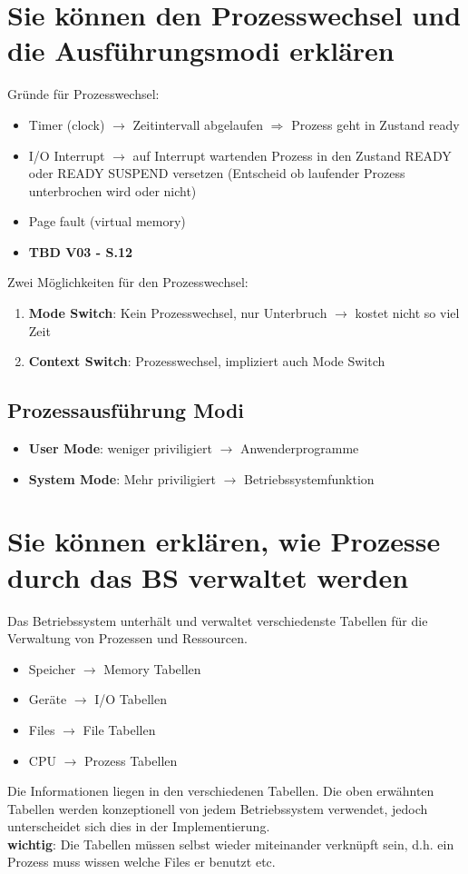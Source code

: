 \documentclass{report}
\theoremstyle{definition}
\theoremstyle{example}
\begin{document}
\section{Sie können den Prozesswechsel und die Ausführungsmodi erklären}
Gründe für Prozesswechsel:\\
\begin{itemize}
	\item Timer (clock) $\rightarrow$ Zeitintervall abgelaufen $\Rightarrow$ Prozess geht in Zustand ready
	\item I/O Interrupt $\rightarrow$ auf Interrupt wartenden Prozess in den Zustand READY oder READY SUSPEND versetzen (Entscheid ob laufender Prozess unterbrochen wird oder nicht)
	\item Page fault (virtual memory)
	\item \textbf{TBD V03 - S.12}
\end{itemize}

Zwei Möglichkeiten für den Prozesswechsel:\\
\begin{enumerate}
	\item \textbf{Mode Switch}: Kein Prozesswechsel, nur Unterbruch $\rightarrow$ kostet nicht so viel Zeit
	\item \textbf{Context Switch}: Prozesswechsel, impliziert auch Mode Switch
\end{enumerate}

	\subsection{Prozessausführung Modi}
\begin{itemize}
	\item \textbf{User Mode}: weniger priviligiert $\rightarrow$ Anwenderprogramme\\
	\item \textbf{System Mode}: Mehr priviligiert $\rightarrow$ Betriebssystemfunktion
\end{itemize}

\section{Sie können erklären, wie Prozesse durch das BS verwaltet werden}
Das Betriebssystem unterhält und verwaltet verschiedenste Tabellen für die Verwaltung von Prozessen und Ressourcen.
\begin{itemize}
	\item Speicher $\rightarrow$ Memory Tabellen
	\item Geräte $\rightarrow$ I/O Tabellen
	\item Files $\rightarrow$ File Tabellen
	\item CPU $\rightarrow$ Prozess Tabellen
\end{itemize}
Die Informationen liegen in den verschiedenen Tabellen. Die oben erwähnten Tabellen werden konzeptionell von jedem Betriebssystem verwendet, jedoch unterscheidet sich dies in der Implementierung.\\
\textbf{wichtig}: Die Tabellen müssen selbst wieder miteinander verknüpft sein, d.h. ein Prozess muss wissen welche Files er benutzt etc.
\end{document}
